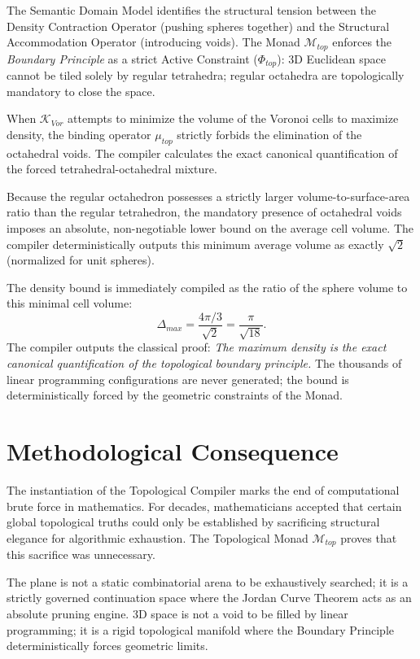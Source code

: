 \documentclass[12pt,openany]{extbook}
\theoremstyle{plain}
\theoremstyle{definition}
\begin{document}
The Semantic Domain Model identifies the structural tension between the Density Contraction Operator (pushing spheres together) and the Structural Accommodation Operator (introducing voids). The Monad $\mathcal{M}_{top}$ enforces the \emph{Boundary Principle} as a strict Active Constraint ($\Phi_{top}$): 3D Euclidean space cannot be tiled solely by regular tetrahedra; regular octahedra are topologically mandatory to close the space.

When $\mathcal{K}_{Vor}$ attempts to minimize the volume of the Voronoi cells to maximize density, the binding operator $\mu_{top}$ strictly forbids the elimination of the octahedral voids. The compiler calculates the exact canonical quantification of the forced tetrahedral-octahedral mixture. 

Because the regular octahedron possesses a strictly larger volume-to-surface-area ratio than the regular tetrahedron, the mandatory presence of octahedral voids imposes an absolute, non-negotiable lower bound on the average cell volume. The compiler deterministically outputs this minimum average volume as exactly $\sqrt{2}$ (normalized for unit spheres). 

The density bound is immediately compiled as the ratio of the sphere volume to this minimal cell volume:
\[
\Delta_{max} = \frac{4\pi/3}{\sqrt{2}} = \frac{\pi}{\sqrt{18}}.
\]
The compiler outputs the classical proof: \emph{The maximum density is the exact canonical quantification of the topological boundary principle.} The thousands of linear programming configurations are never generated; the bound is deterministically forced by the geometric constraints of the Monad.

\section{Methodological Consequence}

The instantiation of the Topological Compiler marks the end of computational brute force in mathematics. For decades, mathematicians accepted that certain global topological truths could only be established by sacrificing structural elegance for algorithmic exhaustion. The Topological Monad $\mathcal{M}_{top}$ proves that this sacrifice was unnecessary.

The plane is not a static combinatorial arena to be exhaustively searched; it is a strictly governed continuation space where the Jordan Curve Theorem acts as an absolute pruning engine. 3D space is not a void to be filled by linear programming; it is a rigid topological manifold where the Boundary Principle deterministically forces geometric limits.
\end{document}
